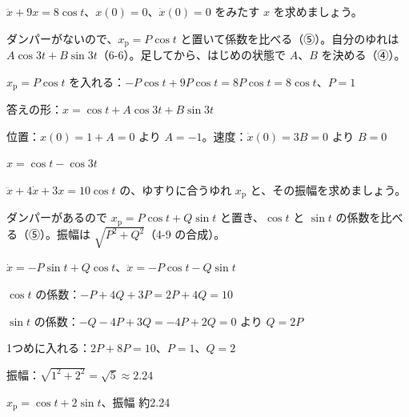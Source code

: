 \begin{reidai}[ダンパーのない強制振動]
$\ddot x+9x=8\cos t$、$x(0)=0$、$\dot x(0)=0$ をみたす $x$ を求めましょう。\par
\kangaekata ダンパーがないので、$x_{\mathrm p}=P\cos t$ と置いて係数を比べる（⑤）。自分のゆれは $A\cos3t+B\sin3t$（6-6）。足してから、はじめの状態で $A$、$B$ を決める（④）。\par
\shiki $x_{\mathrm p}=P\cos t$ を入れる：$-P\cos t+9P\cos t=8P\cos t=8\cos t$、$P=1$\par
\bkvinq 答えの形：$x=\cos t+A\cos3t+B\sin3t$\par
\bkvinq 位置：$x(0)=1+A=0$ より $A=-1$。速度：$\dot x(0)=3B=0$ より $B=0$\par
\kotae $x=\cos t-\cos3t$
\end{reidai}

\begin{bkfigure}
\end{bkfigure}

\begin{reidai}[係数を比べる]
$\ddot x+4\dot x+3x=10\cos t$ の、ゆすりに合うゆれ $x_{\mathrm p}$ と、その振幅を求めましょう。\par
\kangaekata ダンパーがあるので $x_{\mathrm p}=P\cos t+Q\sin t$ と置き、$\cos t$ と $\sin t$ の係数を比べる（⑤）。振幅は $\sqrt{P^2+Q^2}$（4-9 の合成）。\par
\shiki $\dot x=-P\sin t+Q\cos t$、$\ddot x=-P\cos t-Q\sin t$\par
\bkvinq $\cos t$ の係数：$-P+4Q+3P=2P+4Q=10$\par
\bkvinq $\sin t$ の係数：$-Q-4P+3Q=-4P+2Q=0$ より $Q=2P$\par
\bkvinq 1つめに入れる：$2P+8P=10$、$P=1$、$Q=2$\par
\bkvinq 振幅：$\sqrt{1^2+2^2}=\sqrt5\approx2.24$\par
\kotae $x_{\mathrm p}=\cos t+2\sin t$、振幅 約2.24
\end{reidai}

